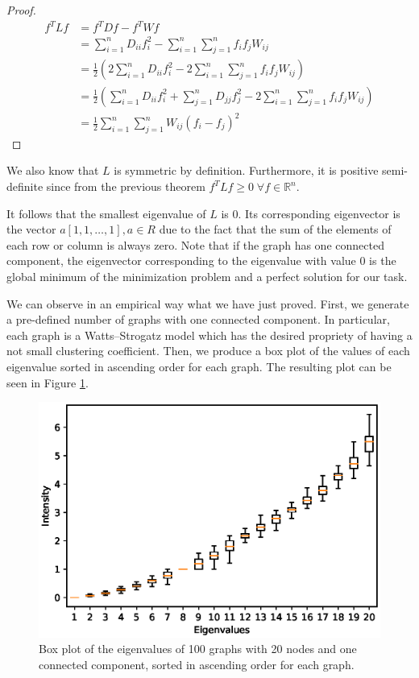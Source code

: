 \documentclass{article}
\begin{document}
\begin{proof}
    \begin{align*}
        f^T L f & = f^T D f - f^T W f                                                                                                 \\
                & = \sum_{i=1}^n D_{ii} f_i^2 - \sum_{i=1}^n \sum_{j=1}^n f_i f_j W_{ij}                                              \\
                & = \frac{1}{2} ( 2 \sum_{i=1}^n D_{ii} f_i^2 - 2 \sum_{i=1}^n \sum_{j=1}^n f_i f_j W_{ij})                           \\
                & = \frac{1}{2} ( \sum_{i=1}^n D_{ii} f_i^2 + \sum_{j=1}^n D_{jj} f_j^2 - 2 \sum_{i=1}^n \sum_{j=1}^n f_i f_j W_{ij}) \\
                & = \frac{1}{2} \sum_{i=1}^n \sum_{j=1}^n W_{ij} (f_i - f_j)^2 \tag*{\qedhere}
    \end{align*}
\end{proof}

We also know that $L$ is symmetric by definition. Furthermore, it is positive semi-definite since from the previous theorem
$f^T L f \geq 0 \; \forall f \in \mathbb{R}^n$.

It follows that the smallest eigenvalue of $L$ is 0. Its corresponding eigenvector is the vector $a [1, 1, \dots, 1], a \in \mathit{R}$
due to the fact that the sum of the elements of each row or column is always zero.
Note that if the graph has one connected component, the eigenvector corresponding to the eigenvalue with value 0 is the global minimum of the
minimization problem and a perfect solution for our task.

We can observe in an empirical way what we have just proved.
First, we generate a pre-defined number of graphs with one connected component.
In particular, each graph is a Watts–Strogatz model \cite{wc} which has the desired propriety of having a not small clustering coefficient.
Then, we produce a box plot of the values of each eigenvalue sorted in ascending order for each graph.
The resulting plot can be seen in Figure \ref{figure:oneeigen}.

\begin{figure}[ht]
    \centering
    \includegraphics[width=0.5\linewidth]{figures/eigen-one-component.eps}
    \caption{Box plot of the eigenvalues of 100 graphs with 20 nodes and one connected component, sorted in ascending order for each graph.}
    \label{figure:oneeigen}
\end{figure}
\end{document}

